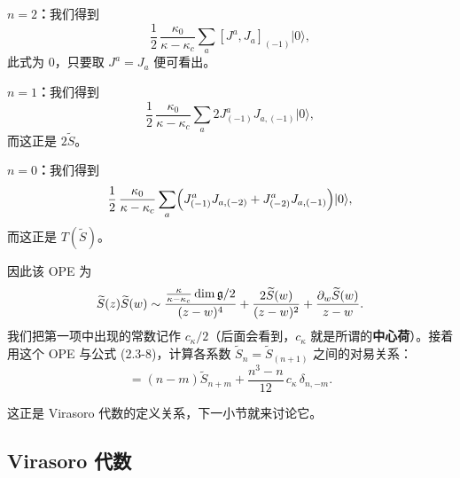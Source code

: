 \textbf{$n=2$：}我们得到
\[
    \frac12\,\frac{\kappa_0}{\kappa-\kappa_c}\sum_a [J^a,J_a]_{(-1)}|0\rangle ,
\]
此式为 $0$，只要取 $J^a=J_a$ 便可看出。

\textbf{$n=1$：}我们得到
\[
    \frac12\,\frac{\kappa_0}{\kappa-\kappa_c}\sum_a 2J^a_{(-1)}J_{a,(-1)}|0\rangle ,
\]
而这正是 $2\widetilde S$。

\textbf{$n=0$：}我们得到
\[
    \frac12\,\frac{\kappa_0}{\kappa-\kappa_c}\sum_a
    \Bigl( J^a_{(-1)}J_{a,(-2)} + J^a_{(-2)}J_{a,(-1)} \Bigr)|0\rangle ,
\]
而这正是 $T(\widetilde S)$。

因此该 OPE 为
\[
    \widetilde S(z)\widetilde S(w) \sim
    \frac{\frac{\kappa}{\kappa-\kappa_c}\dim\mathfrak{g}/2}{(z-w)^4}
    + \frac{2\widetilde S(w)}{(z-w)^2}
    + \frac{\partial_w\widetilde S(w)}{z-w}.
\]
我们把第一项中出现的常数记作 $c_\kappa/2$（后面会看到，$c_\kappa$ 就是所谓的\textbf{中心荷}）。接着用这个 OPE 与公式 (2.3-8)，计算各系数 $\widetilde S_n=\widetilde S_{(n+1)}$ 之间的对易关系：
\begin{equation}
    [\widetilde S_n, \widetilde S_m]
    = (n-m)\widetilde S_{n+m} + \frac{n^3-n}{12}\,c_\kappa\,\delta_{n,-m}.
    \tag{3.1-3}
\end{equation}

这正是 Virasoro 代数的定义关系，下一小节就来讨论它。

\subsection{Virasoro 代数}

